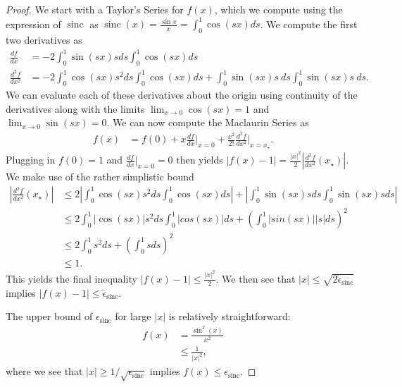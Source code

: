 \documentclass{article}
\newcommand{\parens}[1]{\left( #1 \right)}
\newcommand{\abs}[1]{\left| #1 \right|}
\DeclareMathOperator{\sinc}{sinc}
\begin{document}
\begin{proof}
    We start with a Taylor's Series for $f(x)$, which we compute using the expression of $\sinc$ as $\sinc(x) = \frac{\sin x}{x} = \int_0^1 \cos(sx) ds$. We compute the first two derivatives as
    \begin{align}
        \frac{df}{dx} &= -2 \int_0^1 \sin(sx) s ds \int_0^1 \cos(sx) ds \\
        \frac{d^2f}{dx^2} &= -2 \int_0^1 \cos(sx)s^2 ds \int_0^1 \cos(sx) ds + \int_0^1 \sin(sx) s ~ds \int_0^1 \sin(sx) s ~ds.
    \end{align}
    We can evaluate each of these derivatives about the origin using continuity of the derivatives along with the limits $\lim_{x \to 0} \cos(sx) = 1$ and $\lim_{x \to 0} \sin(sx) = 0$. We can now compute the Maclaurin Series as
    \begin{align}
        f(x) &= f(0) + x \frac{df}{dx}\bigg|_{x = 0} + \frac{x^2}{2!} \frac{d^2f}{dx^2}\bigg|_{x = x_{\star}}.
    \end{align}
    Plugging in $f(0) = 1$ and $\frac{df}{dx}\big|_{x = 0} = 0$ then yields $|f(x) - 1| = \frac{|x|^2}{2} \abs{\frac{d^2f}{dx^2}(x_{\star})}$. We make use of the rather simplistic bound
    \begin{align}
        \abs{\frac{d^2f}{dx^2}(x_{\star})} &\leq 2 \abs{\int_0^1 \cos(sx) s^2 ds \int_0^1 \cos(sx) ds} + \abs{\int_0^1 \sin(sx) s ds \int_0^1 \sin(sx) s ds} \\
        &\leq 2 \int_0^1 \abs{\cos(sx)} s^2 ds \int_0^1 \abs{cos(sx)} ds + \parens{\int_0^1 \abs{sin(sx)} |s| ds}^2 \\
        &\leq 2 \int_0^1 s^2 ds + \parens{\int_0^1 s ds}^2 \\
        &\leq 1.
    \end{align}
    This yields the final inequality $|f(x) - 1| \leq \frac{|x|^2}{2}$. We then see that $|x| \leq \sqrt{2 \widetilde{\epsilon}_{\sinc}}$ implies $|f(x) - 1| \leq \widetilde{\epsilon}_{\sinc}$. 

    The upper bound of $\epsilon_{\sinc}$ for large $|x|$ is relatively straightforward:
    \begin{align}
        f(x) &= \frac{\sin^2(x)}{x^2} \\
            &\leq \frac{1}{|x|^2},
    \end{align}
    where we see that $|x| \geq 1 / \sqrt{\epsilon_{\sinc}}$ implies $f(x) \leq \epsilon_{\sinc}$.
\end{proof}
\end{document}
